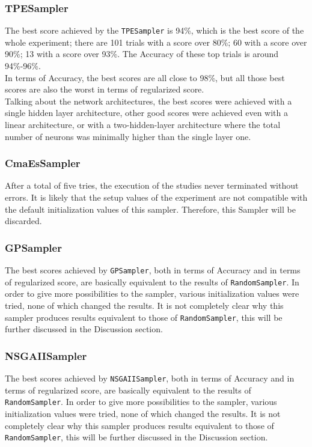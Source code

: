\subsubsection{TPESampler}

The best score achieved by the \texttt{TPESampler} is 94\%, which is the best score of the whole experiment; there are 101 trials with a score over 80\%; 60 with a score over 90\%; 13 with a score over 93\%. The Accuracy of these top trials is around 94\%-96\%.
\\[0.3cm]In terms of Accuracy, the best scores are all close to 98\%, but all those best scores are also the worst in terms of regularized score.
\\[0.3cm]Talking about the network architectures, the best scores were achieved with a single hidden layer architecture, other good scores were achieved even with a linear architecture, or with a two-hidden-layer architecture where the total number of neurons was minimally higher than the single layer one.

\subsubsection{CmaEsSampler}

After a total of five tries, the execution of the studies never terminated without errors.
It is likely that the setup values of the experiment are not compatible with the default initialization values of this sampler.
Therefore, this Sampler will be discarded.

\subsubsection{GPSampler}

The best scores achieved by \texttt{GPSampler}, both in terms of Accuracy and in terms of regularized score, are basically equivalent to the results of \texttt{RandomSampler}.
In order to give more possibilities to the sampler, various initialization values were tried, none of which changed the results.
It is not completely clear why this sampler produces results equivalent to those of \texttt{RandomSampler}, this will be further discussed in the Discussion section.

\subsubsection{NSGAIISampler}

The best scores achieved by \texttt{NSGAIISampler}, both in terms of Accuracy and in terms of regularized score, are basically equivalent to the results of \texttt{RandomSampler}.
In order to give more possibilities to the sampler, various initialization values were tried, none of which changed the results.
It is not completely clear why this sampler produces results equivalent to those of \texttt{RandomSampler}, this will be further discussed in the Discussion section.


